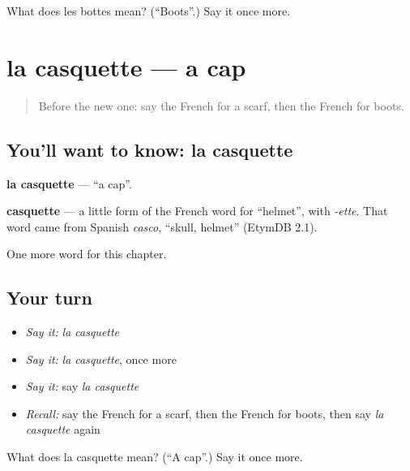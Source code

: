 \begin{tcolorbox}[breakable,colback=teal!4,colframe=teal!35!black,title={Before you move on}]
What does les bottes mean? (\textquotedblleft{}Boots\textquotedblright{}.) Say it once more.
\end{tcolorbox}
\section[la casquette]{la casquette — a cap}

\label{lesson:FR-C117-casquette}



\begin{quote}
Before the new one: say the French for a scarf, then the French for boots.
\end{quote}

\subsection*{You'll want to know: la casquette}
\textbf{la casquette} — \textquotedblleft{}a cap\textquotedblright{}.

\begin{cousinweb}
\textbf{casquette} — a little form of the French word for \textquotedblleft{}helmet\textquotedblright{}, with \emph{-ette}. That word came from Spanish \emph{casco}, \textquotedblleft{}skull, helmet\textquotedblright{} (EtymDB 2.1).
\end{cousinweb}

\begin{grammarlens}[title={What you've built}]
One more word for this chapter.
\end{grammarlens}

\subsection*{Your turn}
\begin{itemize}
\raggedright
  \item \emph{Say it:} \emph{la casquette}
  \item \emph{Say it:} \emph{la casquette}, once more
  \item \emph{Say it:} say \emph{la casquette}
  \item \emph{Recall:} say the French for a scarf, then the French for boots, then say \emph{la casquette} again
\end{itemize}

\begin{tcolorbox}[breakable,colback=teal!4,colframe=teal!35!black,title={Before you move on}]
What does la casquette mean? (\textquotedblleft{}A cap\textquotedblright{}.) Say it once more.
\end{tcolorbox}
